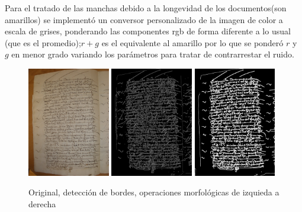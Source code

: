 \documentclass[11pt,a4paper]{article}
\begin{document}
Para el tratado de las manchas debido a la longevidad de los documentos(son amarillos) se implement\'o un conversor personalizado de la imagen de color a escala de grises, ponderando las componentes rgb de forma diferente a lo usual (que es el promedio);$r + g$ es el equivalente al amarillo por lo que se ponderó $r$ y $g$ en menor grado variando los par\'ametros para tratar de contrarrestar el ruido.

\begin{figure}[h] \centering \begin{minipage}{1.0\textwidth} \includegraphics[width=0.32\textwidth]{CODEA-0205_2v.jpg} \includegraphics[width=0.32\textwidth]{canny_image_aftergauss_eq2.png} \includegraphics[width=0.32\textwidth]{photo_2025-01-27_21-34-01.jpg} \caption{Original, detecci\'on de bordes, operaciones morfol\'ogicas de izquieda a derecha} \label{fig:tresfotos} \end{minipage} \end{figure}
\end{document}
